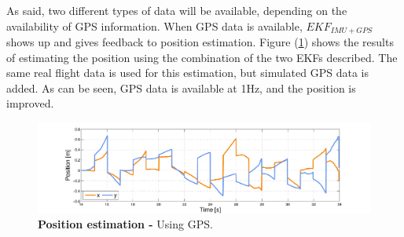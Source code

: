 \documentclass[conference]{IEEEtran}
\newcommand{\refp}[1]{(\ref{#1})}
\begin{document}
As said, two different types of data will be available, depending on the availability of GPS information. When GPS data is available, $EKF_{IMU+GPS}$ shows up and gives feedback to position estimation. Figure \refp{fig:kalman_con_gps} shows the results of estimating the position using the combination of the two EKFs described. The same real flight data is used for this estimation, but simulated GPS data is added. As can be seen, GPS data is available at 1Hz, and the position is improved.
 \begin{figure}
	\includegraphics[width=1\columnwidth]{./pics_paper/position_gps_fake.pdf}
	\caption{\textbf{Position estimation -} Using GPS.}
	\label{fig:kalman_con_gps}
\end{figure}

\end{document}
